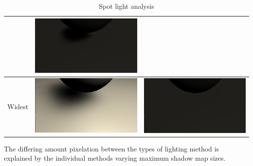 \begin{table}
\begin{tabular}{| c | c | c | }
\begin{minipage}{.5\textwidth}
            \end{minipage}
            &
            \begin{minipage}{.5\textwidth}
            \includegraphics[width=\linewidth]{figures/shadows/spot-wide-far-cleaned}
            \end{minipage}
    \\ \hline
    Widest &  
            \begin{minipage}{.5\textwidth}
            \includegraphics[width=\linewidth]{figures/shadows/spot-widest-cleaned}
            \end{minipage}
            &
            \begin{minipage}{.5\textwidth}
            \includegraphics[width=\linewidth]{figures/shadows/spot-widest-far-cleaned}
            \end{minipage}
    \\ \hline
  \end{tabular}
  \caption{Spot light analysis}\label{tbl:spot-analysis}
\end{table}


The differing amount pixelation between the types of lighting method is explained by the individual methods varying maximum shadow map sizes\cite{unityshadowmapsize}.